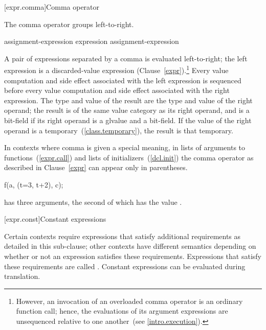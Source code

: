 [expr.comma]{Comma operator}%
%
%
%
%

\pnum
The comma operator groups left-to-right.

\begin{bnf}
\br
    assignment-expression\br
    expression \terminal{,} assignment-expression
\end{bnf}

A pair of expressions separated by a comma is evaluated left-to-right;
the left expression is
a discarded-value expression (Clause~\ref{expr}).\footnote{However, an
invocation of an overloaded comma operator is an ordinary function call; hence,
the evaluations of its argument expressions are unsequenced relative to one
another~(see \ref{intro.execution}).}
Every
%
value computation and side effect
associated with the left expression is sequenced before every value
computation and side effect associated with the right expression.
%
The type and value of the
result are the type and value of the right operand; the result is of the same
value category as its right operand, and is a bit-field if its
right operand is a glvalue and a bit-field.
If the value of the right operand is a temporary~(\ref{class.temporary}),
the result is that temporary.

\pnum
In contexts where comma is given a special meaning, \enterexample in
lists of arguments to functions~(\ref{expr.call}) and lists of
initializers~(\ref{dcl.init}) \exitexample the comma operator as
described in Clause~\ref{expr} can appear only in parentheses.
\enterexample 

\begin{codeblock}
f(a, (t=3, t+2), c);
\end{codeblock}

has three arguments, the second of which has the value
.
\exitexample 

[expr.const]{Constant expressions}%

\pnum
Certain contexts require expressions that satisfy additional
requirements as detailed in this sub-clause; other contexts have different
semantics depending on whether or not an expression satisfies these requirements.
Expressions that satisfy these requirements are called 
. \enternote Constant expressions can be evaluated
during translation.\exitnote

